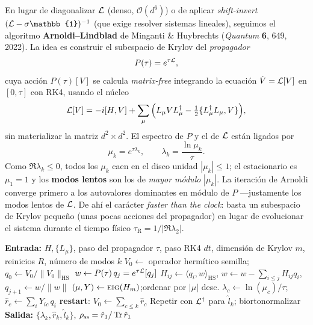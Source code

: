 En lugar de diagonalizar $\mathcal{L}$ (denso, $\mathcal{O}(d^6)$) o de aplicar
\emph{shift-invert} $(\Lop-\sigma\mathbb{1})^{-1}$ (que exige resolver sistemas
lineales), seguimos el algoritmo \textbf{Arnoldi--Lindblad} de Minganti \&
Huybrechts (\emph{Quantum} \textbf{6}, 649, 2022). La idea es construir el
subespacio de Krylov del \emph{propagador}
\begin{equation}
    P(\tau) = e^{\tau\mathcal{L}},
\end{equation}
cuya acción $P(\tau)[V]$ se calcula \emph{matrix-free} integrando la ecuación
$\dot V = \mathcal{L}[V]$ en $[0,\tau]$ con RK4, usando el núcleo
\begin{equation}
    \mathcal{L}[V] = -i[H,V] + \sum_\mu\Big(L_\mu V L_\mu^\dagger
              - \tfrac12\{L_\mu^\dagger L_\mu, V\}\Big),
    \label{eq:spmv}
\end{equation}
sin materializar la matriz $d^2\times d^2$. El espectro de $P$ y el de $\mathcal{L}$ están
ligados por
\begin{equation}
    \mu_k = e^{\tau\lambda_k}, \qquad \lambda_k = \frac{\ln\mu_k}{\tau}.
\end{equation}
Como $\Re\lambda_k\le 0$, todos los $\mu_k$ caen en el disco unidad
$|\mu_k|\le 1$; el estacionario es $\mu_1=1$ y los \textbf{modos lentos} son los de
\emph{mayor módulo} $|\mu_k|$. La iteración de Arnoldi converge primero a los
autovalores dominantes en módulo de $P$ ---justamente los modos lentos de $\mathcal{L}$.
De ahí el carácter \emph{faster than the clock}: basta un subespacio de Krylov
pequeño (unas pocas acciones del propagador) en lugar de evolucionar el sistema
durante el tiempo físico $\tau_{\mathrm R}=1/|\Re\lambda_2|$.

\begin{algorithm}[t]
\caption{Arnoldi--Lindblad (extracción de modos lentos)}
\begin{algorithmic}[1]
\State \textbf{Entrada:} $H,\{L_\mu\}$, paso del propagador $\tau$, paso RK4 $dt$,
       dimensión de Krylov $m$, reinicios $R$, número de modos $k$
\State $V_0 \gets$ operador hermítico semilla;\quad $q_0 \gets V_0/\|V_0\|_{\mathrm{HS}}$
      
    \State $w \gets P(\tau)\,q_j = e^{\tau\mathcal{L}}[q_j]$  
    \State $H_{ij}\gets\langle q_i,w\rangle_{\mathrm{HS}}$,\;
           $w\gets w-\sum_{i\le j}H_{ij}q_i$,\;
           $q_{j+1}\gets w/\|w\|$
  \EndFor
  \State $(\mu, Y)\gets\textsc{eig}(H_{m})$;\quad ordenar por $|\mu|$ desc.
  \State $\lambda_c \gets \ln(\mu_c)/\tau$;\quad $\hat r_c \gets \sum_i Y_{ic}\,q_i$
  \State \textbf{restart}: $V_0\gets\sum_{c\le k}\hat r_c$  
\EndFor
\State Repetir con $\mathcal{L}^\dagger$ para $\hat l_k$;\; biortonormalizar
\State \textbf{Salida:} $\{\lambda_k,\hat r_k,\hat l_k\}$, $\rho_{\mathrm{ss}}=\hat r_1/\Tr\hat r_1$
\end{algorithmic}
\end{algorithm}

